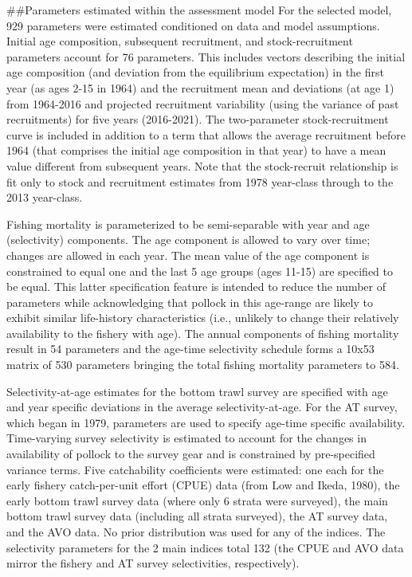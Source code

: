 \#\#Parameters estimated within the assessment model For the selected
model, 929 parameters were estimated conditioned on data and model
assumptions. Initial age composition, subsequent recruitment, and
stock-recruitment parameters account for 76 parameters. This includes
vectors describing the initial age composition (and deviation from the
equilibrium expectation) in the first year (as ages 2-15 in 1964) and
the recruitment mean and deviations (at age 1) from 1964-2016 and
projected recruitment variability (using the variance of past
recruitments) for five years (2016-2021). The two-parameter
stock-recruitment curve is included in addition to a term that allows
the average recruitment before 1964 (that comprises the initial age
composition in that year) to have a mean value different from subsequent
years. Note that the stock-recruit relationship is fit only to stock and
recruitment estimates from 1978 year-class through to the 2013
year-class.

Fishing mortality is parameterized to be semi-separable with year and
age (selectivity) components. The age component is allowed to vary over
time; changes are allowed in each year. The mean value of the age
component is constrained to equal one and the last 5 age groups (ages
11-15) are specified to be equal. This latter specification feature is
intended to reduce the number of parameters while acknowledging that
pollock in this age-range are likely to exhibit similar life-history
characteristics (i.e., unlikely to change their relatively availability
to the fishery with age). The annual components of fishing mortality
result in 54 parameters and the age-time selectivity schedule forms a
10x53 matrix of 530 parameters bringing the total fishing mortality
parameters to 584.

Selectivity-at-age estimates for the bottom trawl survey are specified
with age and year specific deviations in the average selectivity-at-age.
For the AT survey, which began in 1979, parameters are used to specify
age-time specific availability. Time-varying survey selectivity is
estimated to account for the changes in availability of pollock to the
survey gear and is constrained by pre-specified variance terms. Five
catchability coefficients were estimated: one each for the early fishery
catch-per-unit effort (CPUE) data (from Low and Ikeda, 1980), the early
bottom trawl survey data (where only 6 strata were surveyed), the main
bottom trawl survey data (including all strata surveyed), the AT survey
data, and the AVO data. No prior distribution was used for any of the
indices. The selectivity parameters for the 2 main indices total 132
(the CPUE and AVO data mirror the fishery and AT survey selectivities,
respectively).

